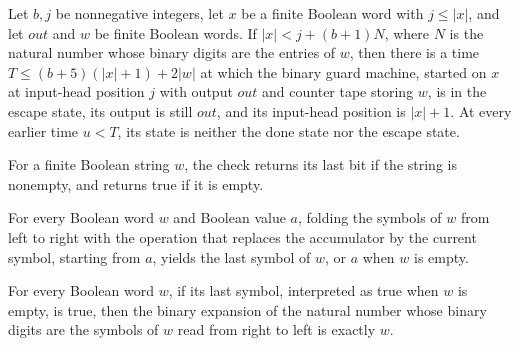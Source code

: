 \begin{lemma}
\label{Turing.MachineFormat.binaryGuard_escape}
\leanok
{}
Let $b,j$ be nonnegative integers, let $x$ be a finite Boolean word with $j\le |x|$, and
let $out$ and $w$ be finite Boolean words. If $|x|<j+(b+1)N$, where $N$ is the natural
number whose binary digits are the entries of $w$, then there is a time $T\le
(b+5)(|x|+1)+2|w|$ at which the binary guard machine, started on $x$ at input-head
position $j$ with output $out$ and counter tape storing $w$, is in the escape state, its
output is still $out$, and its input-head position is $|x|+1$. At every earlier time
$u<T$, its state is neither the done state nor the escape state.
\end{lemma}

\begin{definition}
\label{Turing.MachineFormat.canonBitsOK}
\leanok
For a finite Boolean string $w$, the check returns its last bit if the string is
nonempty, and returns true if it is empty.
\end{definition}

\begin{lemma}
\label{Turing.MachineFormat.canonBits_fold}
\leanok
{}
For every Boolean word $w$ and Boolean value $a$, folding the symbols of $w$ from left
to right with the operation that replaces the accumulator by the current symbol,
starting from $a$, yields the last symbol of $w$, or $a$ when $w$ is empty.
\end{lemma}

\begin{lemma}
\label{Turing.MachineFormat.canonBits_of_last}
\leanok
{}
For every Boolean word $w$, if its last symbol, interpreted as true when $w$ is empty,
is true, then the binary expansion of the natural number whose binary digits are the
symbols of $w$ read from right to left is exactly $w$.
\end{lemma}

